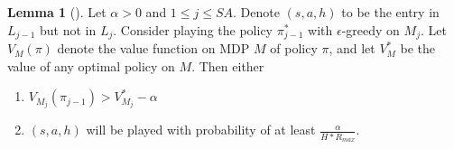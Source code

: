 \documentclass[12pt, letterpaper]{article}
\theoremstyle{definition}
\newtheorem*{lemma}{Lemma}
\theoremstyle{remark}
\begin{document}
\begin{lemma}[]
    Let \(\alpha > 0\) and \(1 \leq j \leq SA\). Denote \((s, a, h)\) to be the entry in \(L_{j-1}\) but not in \(L_{j}\). Consider playing the policy \(\pi_{j-1}^*\) with \(\epsilon\)-greedy on \(M_j\). Let \(V_{M}(\pi)\) denote the value function on MDP \(M\) of policy \(\pi\), and let \(V^*_{M}\) be the value of any optimal policy on \(M\). Then either

    \begin{enumerate}
        \item \(V_{M_j} (\pi_{j-1}) > V^*_{M_j} - \alpha\)
        \item \((s, a, h)\) will be played with probability of at least \(\frac{\alpha}{H*R_{max}}\).
    \end{enumerate}
    
\end{lemma}
\end{document}
